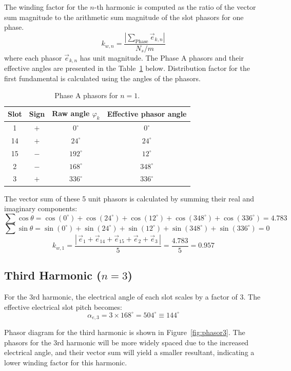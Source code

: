 \documentclass[12pt, a4paper]{article}
\begin{document}
The winding factor for the $n$-th harmonic is computed as the ratio of the vector sum magnitude to the arithmetic sum magnitude of the slot phasors for one phase.
\[k_{w,n} = \frac{\left|\displaystyle\sum_{\text{Phase}} \vec{e}_{k,n}\right|}{N_s / m}\]
where each phasor $\vec{e}_{k,n}$ has unit magnitude. The Phase A phasors and their effective angles are presented in the Table~\ref{tab:phasors_phase_a1} below. Distribution factor for the first fundamental is calculated using the angles of the phasors.

\begin{table}[h!]
\centering
\caption{Phase A phasors for $n=1$.}
\label{tab:phasors_phase_a1}
\begin{tabular}{cccc}
\toprule
\textbf{Slot} & \textbf{Sign} & \textbf{Raw angle $\varphi_k$} & \textbf{Effective phasor angle} \\
\midrule
 1 & $+$ & $  0^\circ$ & $  0^\circ$ \\
14 & $+$ & $ 24^\circ$ & $ 24^\circ$ \\
15 & $-$ & $192^\circ$ & $ 12^\circ$ \\
 2 & $-$ & $168^\circ$ & $348^\circ$ \\
 3 & $+$ & $336^\circ$ & $336^\circ$ \\
\bottomrule
\end{tabular}
\end{table}

The vector sum of these 5 unit phasors is calculated by summing their real and imaginary components:
\[\sum \cos\theta = \cos(0^\circ) + \cos(24^\circ) + \cos(12^\circ) + \cos(348^\circ) + \cos(336^\circ) = 4.783\]
\[\sum \sin\theta = \sin(0^\circ) + \sin(24^\circ) + \sin(12^\circ) + \sin(348^\circ) + \sin(336^\circ) = 0\]
\[k_{w,1} = \frac{|\,\vec{e}_1 + \vec{e}_{14} + \vec{e}_{15} + \vec{e}_2 + \vec{e}_3\,|}{5} = \frac{4.783}{5} = \mathbf{0.957}\]

\subsection{Third Harmonic (\texorpdfstring{$n=3$}{n=3})}

For the 3rd harmonic, the electrical angle of each slot scales by a factor of 3. The effective electrical slot pitch becomes:
\[\alpha_{e,3} = 3 \times 168^\circ = 504^\circ \equiv 144^\circ\]

Phasor diagram for the third harmonic is shown in Figure~\ref{fig:phasor3}. The phasors for the 3rd harmonic will be more widely spaced due to the increased electrical angle, and their vector sum will yield a smaller resultant, indicating a lower winding factor for this harmonic.
\end{document}
